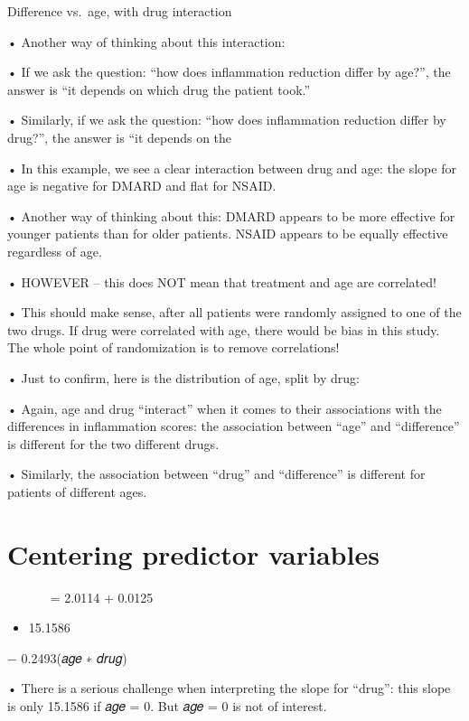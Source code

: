 \documentclass[
  letterpaper,
  DIV=11,
  numbers=noendperiod]{scrreprt}
\providecommand{\tightlist}{%
  \setlength{\itemsep}{0pt}\setlength{\parskip}{0pt}}\usepackage{longtable,booktabs,array}
\begin{document}
Difference vs.~age, with drug interaction

• Another way of thinking about this interaction:

• If we ask the question: ``how does inflammation reduction differ by
age?'', the answer is ``it depends on which drug the patient took.''

• Similarly, if we ask the question: ``how does inflammation reduction
differ by drug?'', the answer is ``it depends on the

• In this example, we see a clear interaction between drug and age: the
slope for age is negative for DMARD and flat for NSAID.

• Another way of thinking about this: DMARD appears to be more effective
for younger patients than for older patients. NSAID appears to be
equally effective regardless of age.

• HOWEVER -- this does NOT mean that treatment and age are correlated!

• This should make sense, after all patients were randomly assigned to
one of the two drugs. If drug were correlated with age, there would be
bias in this study. The whole point of randomization is to remove
correlations!

• Just to confirm, here is the distribution of age, split by drug:

• Again, age and drug ``interact'' when it comes to their associations
with the differences in inflammation scores: the association between
``age'' and ``difference'' is different for the two different drugs.

• Similarly, the association between ``drug'' and ``difference'' is
different for patients of different ages.

\hypertarget{centering-predictor-variables}{%
\section{Centering predictor
variables}\label{centering-predictor-variables}}

𝑑𝑖𝑓𝑓෣𝑒𝑟𝑒𝑛𝑐𝑒 = 2.0114 + 0.0125

\begin{itemize}
\tightlist
\item
  15.1586
\end{itemize}

− 0.2493(𝑎𝑔𝑒 ∗ 𝑑𝑟𝑢𝑔)

• There is a serious challenge when interpreting the slope for ``drug'':
this slope is only 15.1586 if 𝑎𝑔𝑒 = 0. But 𝑎𝑔𝑒 = 0 is not of interest.
\end{document}
